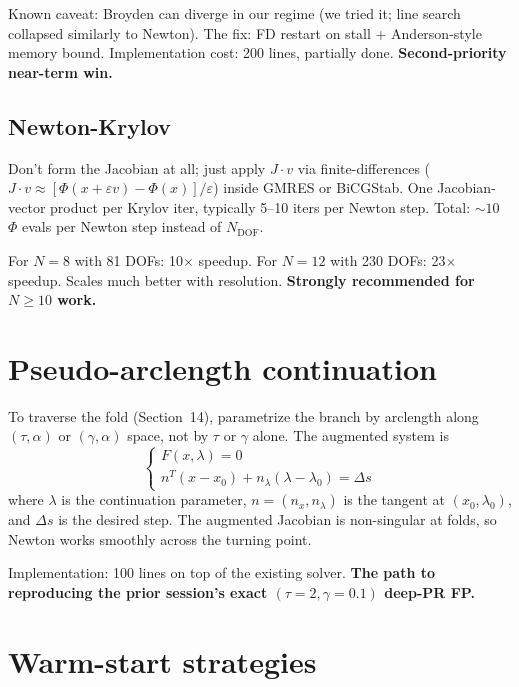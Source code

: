 \documentclass[11pt]{article}
\begin{document}
Known caveat: Broyden can diverge in our regime (we tried it; line search collapsed
similarly to Newton). The fix: FD restart on stall + Anderson-style memory bound.
Implementation cost: 200 lines, partially done. \textbf{Second-priority near-term win.}

\subsection{Newton-Krylov}
Don't form the Jacobian at all; just apply $J\cdot v$ via finite-differences
($J\cdot v \approx [\Phi(x+\varepsilon v) - \Phi(x)]/\varepsilon$) inside GMRES or
BiCGStab. One Jacobian-vector product per Krylov iter, typically 5--10 iters per Newton step.
Total: $\sim 10$ $\Phi$ evals per Newton step instead of $N_{\mathrm{DOF}}$.

For $N=8$ with 81 DOFs: 10$\times$ speedup. For $N=12$ with 230 DOFs: 23$\times$ speedup.
Scales much better with resolution. \textbf{Strongly recommended for $N\ge 10$ work.}

\section{Pseudo-arclength continuation}

To traverse the fold (Section~14), parametrize the branch by arclength along $(\tau,\alpha)$
or $(\gamma,\alpha)$ space, not by $\tau$ or $\gamma$ alone. The augmented system is
\[
\begin{cases} F(x, \lambda) = 0 \\ n^T (x - x_0) + n_\lambda(\lambda - \lambda_0) = \Delta s \end{cases}
\]
where $\lambda$ is the continuation parameter, $n = (n_x, n_\lambda)$ is the tangent at
$(x_0, \lambda_0)$, and $\Delta s$ is the desired step. The augmented Jacobian is
non-singular at folds, so Newton works smoothly across the turning point.

Implementation: 100 lines on top of the existing solver. \textbf{The path to reproducing
the prior session's exact $(\tau{=}2, \gamma{=}0.1)$ deep-PR FP.}

\section{Warm-start strategies}
\end{document}
